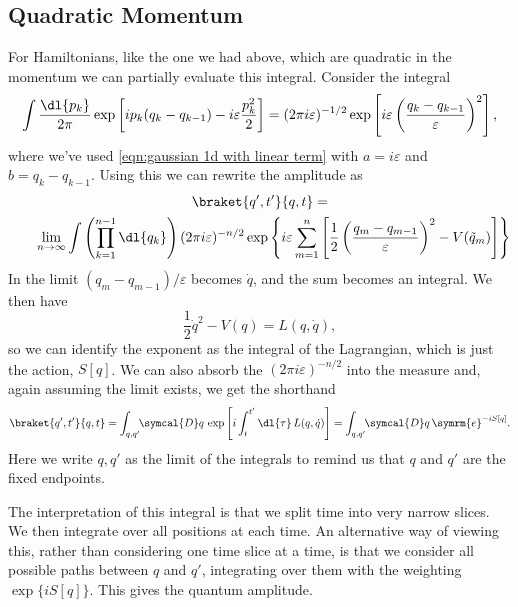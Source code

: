 \documentclass[fleqn]{NotesClass}
\newcommand{\e}{\symrm{e}}
\newcommand{\lagrangian}{L}
\newcommand{\DL}[1]{\symcal{D}#1}
\begin{document}
    \subsection{Quadratic Momentum}
    For Hamiltonians, like the one we had above, which are quadratic in the momentum we can partially evaluate this integral.
    Consider the integral
    \begin{equation*}
        \int \frac{\dl{p_k}}{2\pi} \exp\left[ ip_k(q_k - q_{k-1}) - i\varepsilon\frac{p_k^2}{2} \right] = (2\pi i\varepsilon)^{-1/2} \exp\left[ i\varepsilon\left( \frac{q_k - q_{k-1}}{\varepsilon} \right)^2 \right],
    \end{equation*}
    where we've used \cref{eqn:gaussian 1d with linear term} with \(a = i\varepsilon\) and \(b = q_k - q_{k-1}\).
    Using this we can rewrite the amplitude as
    \begin{gather}
        \braket{q',t'}{q,t} =\\
        \qquad \lim_{n\to \infty} \int \left( \prod_{k=1}^{n-1} \dl{q_k} \right) (2\pi i\varepsilon)^{-n/2} \exp\left\{ i\varepsilon \sum_{m=1}^{n} \left[ \frac{1}{2}\left( \frac{q_m - q_{m-1}}{\varepsilon} \right)^2 - V(\tilde{q}_m) \right] \right\} \notag
    \end{gather}
    In the limit \((q_m - q_{m-1})/\varepsilon\) becomes \(\dot{q}\), and the sum becomes an integral.
    We then have
    \begin{equation}
        \frac{1}{2}\dot{q}^2 - V(q) = \lagrangian(q, \dot{q}),
    \end{equation}
    so we can identify the exponent as the integral of the Lagrangian, which is just the action, \(S[q]\).
    We can also absorb the \((2\pi i\varepsilon)^{-n/2}\) into the measure and, again assuming the limit exists, we get the shorthand
    \begin{equation}
        \braket{q', t'}{q, t} = \int_{q, q'} \!\! \DL{q} \, \exp\left[ i\int_t^{t'} \dl{\tau} \, \lagrangian(q, \dot{q}) \right] = \int_{q,q'} \!\! \DL{q} \, \e^{-iS[q]}.
    \end{equation}
    Here we write \(q,q'\) as the limit of the integrals to remind us that \(q\) and \(q'\) are the fixed endpoints.
    
    The interpretation of this integral is that we split time into very narrow slices.
    We then integrate over all positions at each time.
    An alternative way of viewing this, rather than considering one time slice at a time, is that we consider all possible paths between \(q\) and \(q'\), integrating over them with the weighting \(\exp\{iS[q]\}\).
    This gives the quantum amplitude.
    
\end{document}
